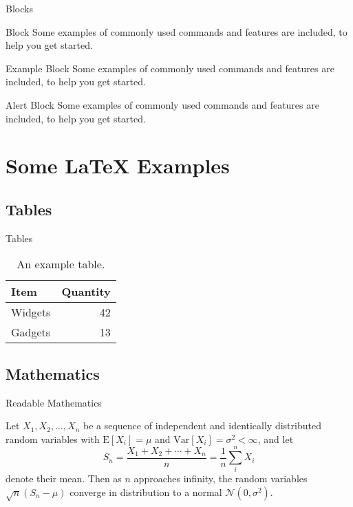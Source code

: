 \documentclass[10pt]{beamer} %
\begin{document}
\begin{frame}{Blocks}

\begin{block}{Block}
Some examples of commonly used commands and features are included, to help you get started.
\end{block}

\begin{exampleblock}{Example Block}
Some examples of commonly used commands and features are included, to help you get started.
\end{exampleblock}

\begin{alertblock}{Alert Block}
Some examples of commonly used commands and features are included, to help you get started.
\end{alertblock}

\end{frame}

\section{Some \LaTeX{} Examples}
\subsection{Tables}

\begin{frame}{Tables}

\begin{table}
\centering
\begin{tabular}{l|r}
Item & Quantity \\\hline
Widgets & 42 \\
Gadgets & 13
\end{tabular}
\caption{\label{tab:widgets}An example table.}
\end{table}

\end{frame}

\subsection{Mathematics}

\begin{frame}{Readable Mathematics}

Let $X_1, X_2, \ldots, X_n$ be a sequence of independent and identically distributed random variables with $\text{E}[X_i] = \mu$ and $\text{Var}[X_i] = \sigma^2 < \infty$, and let
$$S_n = \frac{X_1 + X_2 + \cdots + X_n}{n}
      = \frac{1}{n}\sum_{i}^{n} X_i$$
denote their mean. Then as $n$ approaches infinity, the random variables $\sqrt{n}(S_n - \mu)$ converge in distribution to a normal $\mathcal{N}(0, \sigma^2)$.

\end{frame}
\end{document}
